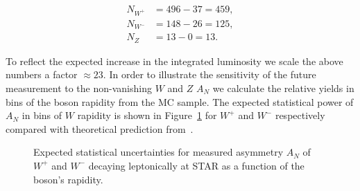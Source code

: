 \documentclass[12pt]{article}
\begin{document}
\begin{align*}
N_{W^+} &= 496 - 37 = 459,\\
N_{W^-} &= 148 - 26 = 125,\\
N_Z &= 13 - 0 = 13.
\end{align*}

To reflect the expected increase in the integrated luminosity we scale the
above numbers a factor $\approx 23$. In order to illustrate the sensitivity of
the future measurement to the non-vanishing $W$ and $Z$ $A_N$ we calculate the
relative yields in bins of the boson rapidity from the MC sample. The expected
statistical power of $A_N$ in bins of $W$ rapidity is shown in
Figure~\ref{fig:MC_Wmeas_stat} for $W^+$ and $W^-$ respectively compared with
theoretical prediction from~\cite{Kang:2009bp}.

\begin{figure}

\caption[]{Expected statistical uncertainties for measured asymmetry $A_N$ of
$W^+$  and $W^-$ 
decaying leptonically at STAR as a function of the boson's rapidity.}

\label{fig:MC_Wmeas_stat} 
\end{figure}
\end{document}
